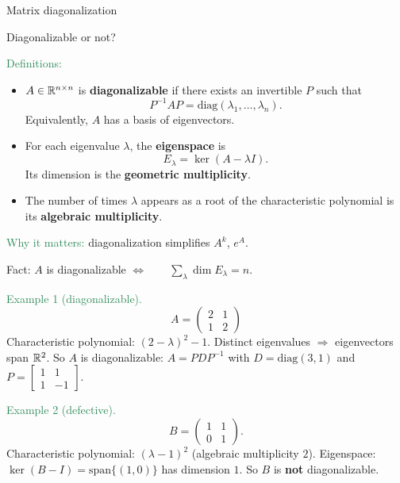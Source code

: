 \documentclass{beamer}
\begin{document}
\begin{frame} \begin{center}
	\alert{\Huge Matrix diagonalization}
\end{center}\end{frame}


\begin{frame}{Diagonalizable or not?}

\textcolor{SeaGreen}{Definitions:}
\begin{itemize}
\item $A\in\mathbb R^{n\times n}$ is \textbf{diagonalizable} if there exists an invertible $P$ such that
\[
P^{-1}AP=\mathrm{diag}(\lambda_1,\ldots,\lambda_n).
\]
Equivalently, $A$ has a basis of eigenvectors.
\item For each eigenvalue $\lambda$, the \textbf{eigenspace} is
\[
E_\lambda=\ker(A-\lambda I).
\]
Its dimension is the \textbf{geometric multiplicity}.
\item The number of times $\lambda$ appears as a root of the characteristic polynomial is its \textbf{algebraic multiplicity}.
\end{itemize}
\medskip
\textcolor{SeaGreen}{Why it matters:} diagonalization simplifies $A^k$, $e^A$.


\end{frame}

\begin{frame}{}
	\begin{alertblock}{Fact:}
		$A$ is diagonalizable \qquad $\Longleftrightarrow\qquad \sum_\lambda \dim E_\lambda=n$.
	\end{alertblock}

\textcolor{SeaGreen}{Example 1 (diagonalizable).}
\[
A=\begin{pmatrix}2&	1\\1&2\end{pmatrix}
\]
Characteristic polynomial: $(2-\lambda)^2-1$.  
Distinct eigenvalues $\Rightarrow$ eigenvectors span $\mathbb R^2$.  
So $A$ is diagonalizable: $A=PDP^{-1}$ with $D=\mathrm{diag}(3,1)$ and $P=\begin{bmatrix}
	1 & 1\\
	1 & -1
\end{bmatrix}$.

\medskip
\textcolor{SeaGreen}{Example 2 (defective).}
\[
B=\begin{pmatrix}1&1\\0&1\end{pmatrix}.
\]
Characteristic polynomial: $(\lambda-1)^2$ (algebraic multiplicity $2$).  
Eigenspace: $\ker(B-I)=\mathrm{span}\{(1,0)\}$ has dimension $1$.  
So $B$ is \textbf{not} diagonalizable.

\end{frame}
\end{document}

